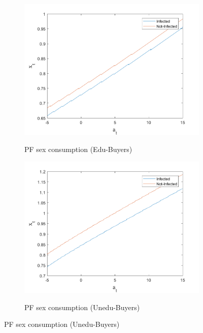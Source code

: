 \begin{figure}[H]\caption{Myopic onset of the epidemic, continuation}
\begin{subfigure}{0.5\textwidth}\caption{PF sex consumption (Edu-Buyers)}
   \includegraphics[width=\linewidth,height = 0.22\textheight]{figures/mio/FIG9.png}
    \label{stage_2fig_1}
\end{subfigure}
\hspace*{\fill}
\begin{subfigure}{0.5\textwidth}\caption{PF sex consumption (Unedu-Buyers)}
   \includegraphics[width=\linewidth,height = 0.22\textheight]{figures/mio/FIG10.png}
    \label{stage_2fig_2}
\end{subfigure}

\end{figure}
